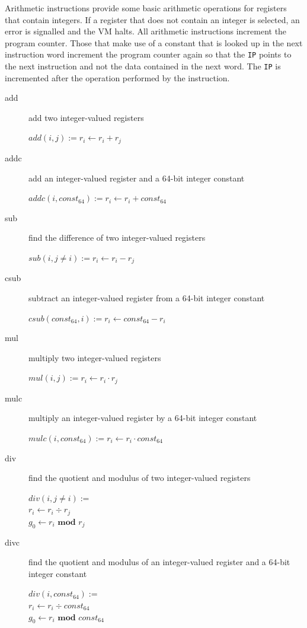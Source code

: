 \documentclass[english,a4paper]{article}
\begin{document}
Arithmetic instructions provide some basic arithmetic operations for
registers that contain integers. If a register that does not contain
an integer is selected, an error is signalled and the VM halts. All
arithmetic instructions increment the program counter. Those that make
use of a constant that is looked up in the next instruction word
increment the program counter again so that the \verb|IP| points to
the next instruction and not the data contained in the next word. The
\verb|IP| is incremented after the operation performed by the
instruction.

\begin{description}
\item[add] add two integer-valued registers

  $add(i, j) := r _{i} \longleftarrow  r _{i} + r_{j} $ \\

\item[addc] add an integer-valued register and a 64-bit integer
  constant

  $addc(i, const _{64}) := r _{i} \longleftarrow  r _{i} + const _{64} $ \\

\item[sub] find the difference of two integer-valued registers

  $sub(i, j\neq i) := r _{i} \longleftarrow  r _{i} - r _{j} $ \\

\item[csub] subtract an integer-valued register from a 64-bit integer
  constant

  $csub(const _{64}, i) := r _{i} \longleftarrow const _{64} - r _{i} $ \\

\item[mul] multiply two integer-valued registers

  $mul(i, j) := r _{i} \longleftarrow  r _{i} \cdot r _{j} $ \\

\item[mulc] multiply an integer-valued register by a 64-bit integer
  constant

  $mulc(i, const _{64}) := r _{i} \longleftarrow r _{i} \cdot const _{64} $

\item[div] find the quotient and modulus of two integer-valued
  registers

  $div(i, j\neq i) :=$ \\
  $ r _{i} \longleftarrow  r _{i} \div r _{j}$ \\
  $ g _{0} \longleftarrow  r _{i} \textbf{ mod } r _{j} $\\

\item[divc] find the quotient and modulus of an integer-valued
  register and a 64-bit integer constant

  $div(i, const _{64}) :=$ \\
  $ r _{i} \longleftarrow  r _{i} \div const_{64}$ \\
  $ g _{0} \longleftarrow r _{i} \textbf{ mod } const_{64} $

\end{description}
\end{document}
